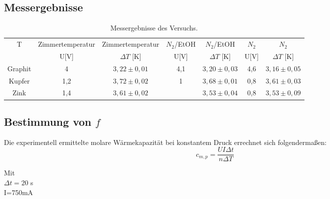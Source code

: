 \documentclass[12pt,a4paper,titlepage,headinclude,bibtotoc]{scrartcl}
\begin{document}
\subsection{Messergebnisse}
\begin{table}
\centering
\caption{Messergebnisse des Versuchs.}
\begin{tabular}{c|c|c|c|c|c|c}
T & Zimmertemperatur &Zimmertemperatur& $N_2$/EtOH& $N_2$/EtOH& $N_2$& $N_2$\\ 
& U[V]& $\Delta T$ [K]&U[V]& $\Delta T$ [K]&U[V]& $\Delta T$ [K]\\
\hline
Graphit & 4 & $3,22\pm0,01$ & 4,1 &$3,20\pm0,03$&4,6&$3,16\pm0,05$\\  
Kupfer & 1,2 & $3,72\pm0,02$ & 1 &$3,68\pm 0,01$&0,8&$3,61\pm0,03$\\ 
Zink & 1,4 & $3,61\pm 0,02$ & &$3,53\pm0,04$&0,8&$3,53\pm 0,09$ \\ 
\end{tabular} 
\end{table}
\subsection{Bestimmung von $f$}

Die experimentell ermittelte molare Wärmekapazität bei konstantem Druck errechnet sich folgendermaßen:\\

\begin{equation}
c_{m,p} = \frac{UI\Delta t}{n\Delta T}
\end{equation}

Mit\\
$\Delta t= 20$ s\\
I=750mA\\
\end{document}

